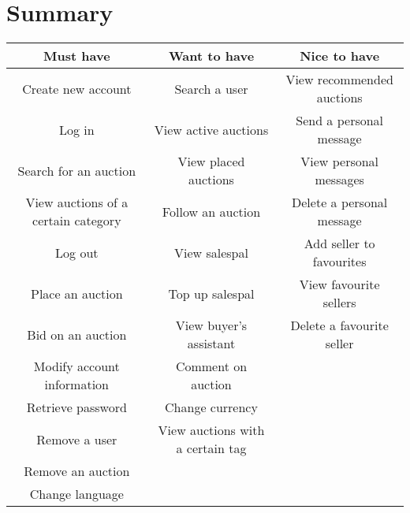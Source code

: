 \section{Summary}
	\begin{tabular}{|c|c|c|}	
		\hline \textbf{Must have} & \textbf{Want to have} & \textbf{Nice to have} \\ 
		\hline  Create new account & Search a user & View recommended auctions \\ 
		\hline  Log in & View active auctions & Send a personal message \\ 
		\hline  Search for an auction & View placed auctions & View personal messages \\
		\hline  View auctions of a certain category & Follow an auction & Delete a personal message \\ 
		\hline  Log out & View salespal & Add seller to favourites \\ 
		\hline  Place an auction & Top up salespal & View favourite sellers \\ 
		\hline  Bid on an auction & View buyer's assistant &  Delete a favourite seller\\ 
		\hline  Modify account information & Comment on auction &  \\ 
		\hline  Retrieve password & Change currency &  \\ 
		\hline  Remove a user & View auctions with a certain tag &  \\ 
		\hline  Remove an auction &  &  \\ 
		\hline  Change language &  &  \\ 
		\hline
	\end{tabular} 